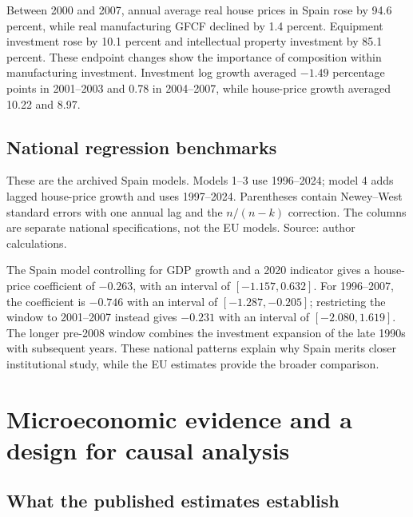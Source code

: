 \documentclass[11pt,letterpaper]{article}
\begin{document}
Between 2000 and 2007, annual average real house prices in Spain rose by 94.6 percent, while real manufacturing GFCF declined by 1.4 percent. Equipment investment rose by 10.1 percent and intellectual property investment by 85.1 percent. These endpoint changes show the importance of composition within manufacturing investment. Investment log growth averaged $-1.49$ percentage points in 2001--2003 and 0.78 in 2004--2007, while house-price growth averaged 10.22 and 8.97.

\subsection{National regression benchmarks}
\begin{table}[!htbp]\centering\begin{threeparttable}
\caption{Spain: national time-series benchmarks}\label{tab:spain}
\small{}\setlength{\tabcolsep}{4pt}\renewcommand{\arraystretch}{1.22}

\begin{tablenotes}[flushleft]\footnotesize{}
\item These are the archived Spain models. Models 1--3 use 1996--2024; model 4 adds lagged house-price growth and uses 1997--2024. Parentheses contain Newey--West standard errors with one annual lag and the $n/(n-k)$ correction. The columns are separate national specifications, not the EU models. Source: author calculations.
\end{tablenotes}\end{threeparttable}\end{table}\FloatBarrier

The Spain model controlling for GDP growth and a 2020 indicator gives a house-price coefficient of $-0.263$, with an interval of $[-1.157,0.632]$. For 1996--2007, the coefficient is $-0.746$ with an interval of $[-1.287,-0.205]$; restricting the window to 2001--2007 instead gives $-0.231$ with an interval of $[-2.080,1.619]$. The longer pre-2008 window combines the investment expansion of the late 1990s with subsequent years. These national patterns explain why Spain merits closer institutional study, while the EU estimates provide the broader comparison.

\section{Microeconomic evidence and a design for causal analysis}

\subsection{What the published estimates establish}
\end{document}
